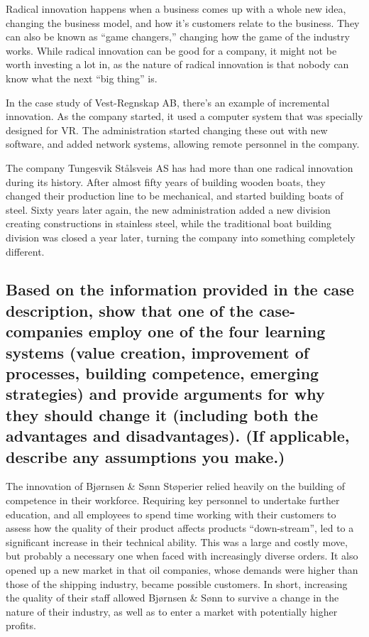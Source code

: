 \documentclass[a4paper]{article}
\begin{document}
    Radical innovation happens when a business comes up with a whole new
    idea, changing the business model, and how it's customers relate to the
    business. They can also be known as ``game changers,'' changing how the
    game of the industry works. While radical innovation can be good for
    a company, it might not be worth investing a lot in, as the nature of
    radical innovation is that nobody can know what the next ``big thing'' is.

    In the case study of Vest-Regnskap AB, there's an example of incremental
    innovation. As the company started, it used a computer system that was
    specially designed for VR. The administration started changing these out
    with new software, and added network systems, allowing remote personnel in
    the company.

    The company Tungesvik Stålsveis AS has had more than one radical
    innovation during its history. After almost fifty years of building wooden
    boats, they changed their production line to be mechanical, and started
    building boats of steel. Sixty years later again, the new administration
    added a new division creating constructions in stainless steel, while the
    traditional boat building division was closed a year later, turning the
    company into something completely different.

    \subsection*{Based on the information provided in the case description,
    show that one of the case-companies employ one of the four learning
    systems (value creation, improvement of processes, building competence,
    emerging strategies) and provide arguments for why they should
    change it (including both the advantages and disadvantages). (If
    applicable, describe any assumptions you make.)}

    The innovation of Bjørnsen \& Sønn Støperier relied heavily on the
    building of competence in their workforce. Requiring key personnel to
    undertake further education, and all employees to spend time working
    with their customers to assess how the quality of their product affects
    products ``down-stream'', led to a significant increase in their technical
    ability. This was a large and costly move, but probably a necessary one
    when faced with increasingly diverse orders. It also opened up a new market
    in that oil companies, whose demands were higher than those of the shipping
    industry, became possible customers. In short, increasing the quality of
    their staff allowed Bjørnsen \& Sønn to survive a change in the nature of
    their industry, as well as to enter a market with potentially higher
    profits.
\end{document}
